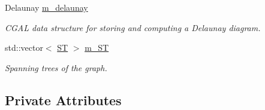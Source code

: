 \begin{DoxyCompactItemize}
Delaunay \hyperlink{classcmst_1_1_graph2_d_af19557df59901e6078c2038652c95623}{m\+\_\+delaunay}
\begin{DoxyCompactList}\small\item\em C\+G\+AL data structure for storing and computing a Delaunay diagram. \end{DoxyCompactList}\item 
std\+::vector$<$ \hyperlink{structcmst_1_1_graph2_d_1_1_s_t}{ST} $>$ \hyperlink{classcmst_1_1_graph2_d_a829dc681f90679478b0ba9676af0bc03}{m\+\_\+\+ST}
\begin{DoxyCompactList}\small\item\em Spanning trees of the graph. \end{DoxyCompactList}\end{DoxyCompactItemize}
\subsection*{Private Attributes}

